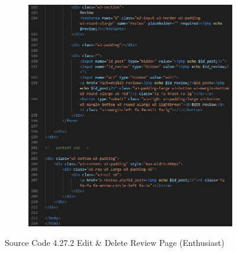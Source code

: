 \begin{enumerate}[1.]
\begin{figure}[h]
\begin{subfigure}[b]{0.8\textwidth}
            \includegraphics[width=\textwidth]{mainmatter/images/frontend/code/eeditereview3.png}
            \label{fig:sub3}
        \end{subfigure}
        \caption*{Source Code 4.27.2 Edit \& Delete Review Page (Enthusiast)}
        \label{fig:myfig66b}
    \end{figure}
    \clearpage


\end{enumerate}
